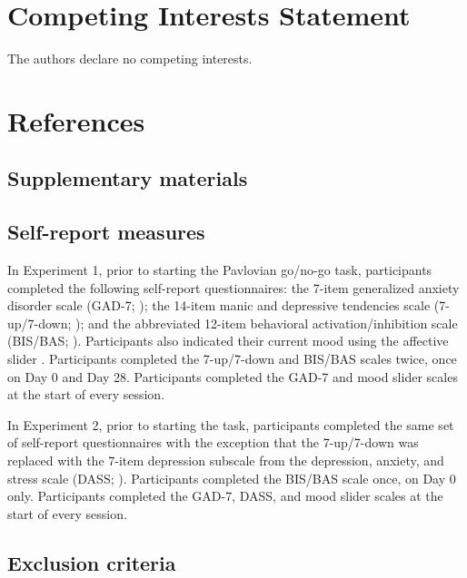 \documentclass[a4paper,12pt]{article}
\begin{document}
\begin{refsection}[main]
\section*{Competing Interests Statement}

The authors declare no competing interests.

\break
\section*{References}
\printbibliography[heading=main]
\end{refsection}

\break
\begin{refsection}[supp]
\section*{Supplementary materials}
\setcounter{figure}{0}
\setcounter{table}{0}
\renewcommand{\thetable}{S\arabic{table}}
\renewcommand{\thefigure}{S\arabic{figure}}

\subsection*{Self-report measures}

In Experiment 1, prior to starting the Pavlovian go/no-go task, participants completed the following self-report questionnaires: the 7-item generalized anxiety disorder scale (GAD-7; \cite{spitzer2006brief}); the 14-item manic and depressive tendencies scale (7-up/7-down; \cite{youngstrom20137}); and the abbreviated 12-item behavioral activation/inhibition scale (BIS/BAS; \cite{pagliaccio2016revising}). Participants also indicated their current mood using the affective slider \cite{betella2016affective}. Participants completed the 7-up/7-down and BIS/BAS scales twice, once on Day 0 and Day 28. Participants completed the GAD-7 and mood slider scales at the start of every session. 

In Experiment 2, prior to starting the task, participants completed the same set of self-report questionnaires with the exception that the 7-up/7-down was replaced with the 7-item depression subscale from the depression, anxiety, and stress scale (DASS; \cite{henry2005short}). Participants completed the BIS/BAS scale once, on Day 0 only. Participants completed the GAD-7, DASS, and mood slider scales at the start of every session. 

\subsection*{Exclusion criteria}


\end{refsection}
\end{document}
